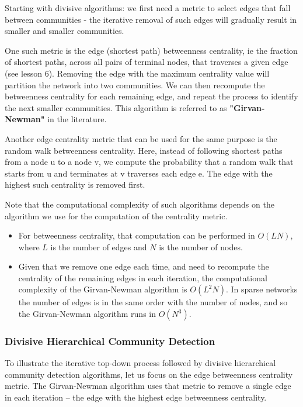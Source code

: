 \documentclass[11pt]{scrartcl} %
\begin{document}
Starting with divisive algorithms: we first need a metric to select edges that fall between communities - the iterative removal of such edges will gradually result in smaller and smaller communities.

One such metric is the edge (shortest path) betweenness centrality, ie the fraction of shortest paths, across all pairs of terminal nodes, that traverses a given edge  (see lesson 6). Removing the edge with the maximum centrality value will partition the network into two communities. We can then recompute the betweenness centrality for each remaining edge, and repeat the process to identify the next smaller communities.  This algorithm is referred to as \textbf{"Girvan-Newman"} in the literature.

Another edge centrality metric that can be used for the same purpose is the random walk betweenness centrality. Here, instead of following shortest paths from a node u to a node v, we compute the probability that a random walk that starts from u and terminates at v traverses each edge e. The edge with the highest such centrality is removed first.

Note that the computational complexity of such algorithms depends on the algorithm we use for the computation of the centrality metric. 
\begin{itemize}
	\item For betweenness centrality, that computation can be performed in $O(LN)$, where $L$ is the number of edges and $N$ is the number of nodes. 
	\item Given that we remove one edge each time, and need to recompute the centrality of the remaining edges in each iteration, the computational complexity of the Girvan-Newman algorithm is $O(L^2 N)$. In sparse networks the number of edges is in the same order with the number of nodes, and so the Girvan-Newman algorithm runs in $O(N^3)$.
\end{itemize}

\subsubsection{Divisive Hierarchical Community Detection}
To illustrate the iterative top-down process followed by divisive hierarchical community detection algorithms, let us focus on the edge betweenness centrality metric. The Girvan-Newman algorithm uses that metric to remove a single edge in each iteration – the edge with the highest edge betweenness centrality. 
\end{document}
